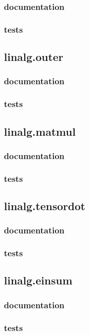 \documentclass[a4paper,11pt]{article}
\begin{document}
\subsubsection{documentation}
\subsubsection{tests}
\subsection{linalg.outer}

\subsubsection{documentation}
\subsubsection{tests}
\subsection{linalg.matmul}

\subsubsection{documentation}
\subsubsection{tests}
\subsection{linalg.tensordot}

\subsubsection{documentation}
\subsubsection{tests}
\subsection{linalg.einsum}

\subsubsection{documentation}
\subsubsection{tests}
\end{document}
